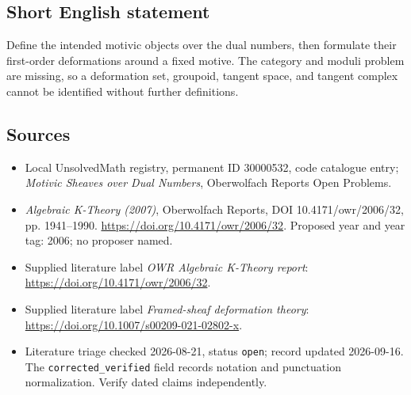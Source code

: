 \documentclass[11pt]{article}
\begin{document}
\subsection{Short English statement}
Define the intended motivic objects over the dual numbers, then formulate their first-order deformations around a fixed motive. The category and moduli problem are missing, so a deformation set, groupoid, tangent space, and tangent complex cannot be identified without further definitions.
\subsection{Sources}
\begin{itemize}\item Local UnsolvedMath registry, permanent ID 30000532, code catalogue entry; \emph{Motivic Sheaves over Dual Numbers}, Oberwolfach Reports Open Problems.\item \emph{Algebraic K-Theory (2007)}, Oberwolfach Reports, DOI 10.4171/owr/2006/32, pp. 1941--1990. \url{https://doi.org/10.4171/owr/2006/32}. Proposed year and year tag: 2006; no proposer named.\item Supplied literature label \emph{OWR Algebraic K-Theory report}: \url{https://doi.org/10.4171/owr/2006/32}.\item Supplied literature label \emph{Framed-sheaf deformation theory}: \url{https://doi.org/10.1007/s00209-021-02802-x}.\item Literature triage checked 2026-08-21, status \texttt{open}; record updated 2026-09-16. The \texttt{corrected\_verified} field records notation and punctuation normalization. Verify dated claims independently.\end{itemize}
\end{document}
